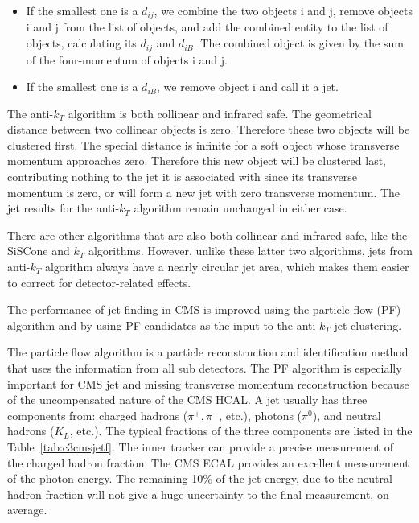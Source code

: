\begin{itemize}
  \item If the smallest one is a $d_{ij}$, we combine the two objects i and j, remove objects i and j from the list of objects, and add the combined entity to the list of objects, calculating its $d_{ij}$ and $d_{iB}$. The combined object is given by the sum of the four-momentum of objects i and j.
  \item If the smallest one is a $d_{iB}$, we remove object i and call it a jet.
\end{itemize}

The anti-$k_{T}$ algorithm is both collinear and infrared safe. The geometrical distance between two collinear objects is zero. Therefore these two objects will be clustered first. The special distance is infinite for a soft object whose transverse momentum approaches zero. Therefore this new object will be clustered last, contributing nothing to the jet it is associated with since its transverse momentum is zero, or will form a new jet with zero transverse momentum. The jet results for the anti-$k_{T}$ algorithm remain unchanged in either case. 

There are other algorithms that are also both collinear and infrared safe, like the SiSCone\cite{Salam:2007xv} and $k_{T}$\cite{Cacciari:2005hq} algorithms. However, unlike these latter two algorithms, jets from anti-$k_{T}$ algorithm always have a nearly circular jet area\cite{Cacciari:2008gn}, which makes them easier to correct for detector-related effects.

The performance of jet finding in CMS is improved using the particle-flow (PF) algorithm\cite{CMS-PAS-PFT-09-001} and by using PF candidates as the input to the anti-$k_{T}$ jet clustering. 

The particle flow algorithm is a particle reconstruction and identification method that uses the information from all sub detectors. The PF algorithm is especially important for CMS jet and missing transverse momentum reconstruction because of the uncompensated nature of the CMS HCAL. A jet usually has three components from: charged hadrons ($\pi^{+},\pi^{-}$, etc.), photons ($\pi^{0}$), and neutral hadrons ($K_{L}$, etc.). The typical fractions of the three components are listed in the Table~\ref{tab:c3cmsjetf}. The inner tracker can provide a precise measurement of the charged hadron fraction. The CMS ECAL provides an excellent measurement of the photon energy. The remaining 10\% of the jet energy, due to the neutral hadron fraction will not give a huge uncertainty to the final measurement, on average. 


